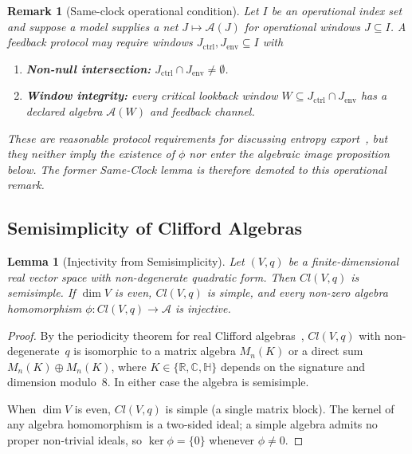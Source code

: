\documentclass[12pt,a4paper,openany]{book}
\newtheorem{lemma}[theorem]{Lemma}
\newtheorem{remark}[theorem]{Remark}
\begin{document}
\begin{remark}[Same-clock operational condition]
Let $I$ be an operational index set and suppose a model supplies a net $J\mapsto\mathcal A(J)$ for operational windows $J\subseteq I$.  A feedback protocol may require windows $J_{\mathrm{ctrl}},J_{\mathrm{env}}\subseteq I$ with
\begin{enumerate}
    \item \textbf{Non-null intersection:} $J_{\mathrm{ctrl}}\cap J_{\mathrm{env}}\neq\emptyset$.
    \item \textbf{Window integrity:} every critical lookback window $W\subseteq J_{\mathrm{ctrl}}\cap J_{\mathrm{env}}$ has a declared algebra $\mathcal A(W)$ and feedback channel.
\end{enumerate}
These are reasonable protocol requirements for discussing entropy export~\cite{Seifert2012}, but they neither imply the existence of $\phi$ nor enter the algebraic image proposition below.  The former Same-Clock lemma is therefore demoted to this operational remark.
\end{remark}

\subsection{Semisimplicity of Clifford Algebras}

\begin{lemma}[Injectivity from Semisimplicity]
\label{C-lem:semisimple}
Let $(V,q)$ be a finite-dimensional real vector space with
non-degenerate quadratic form.
Then $Cl(V,q)$ is semisimple.
If\/ $\dim V$ is even, $Cl(V,q)$ is simple, and every
non-zero algebra homomorphism
$\phi: Cl(V,q) \to \mathcal{A}$ is injective.
\end{lemma}

\begin{proof}
By the periodicity theorem for real Clifford
algebras~\cite{ABS1964,LawsonMichelsohn1989}, $Cl(V,q)$
with non-degenerate~$q$ is isomorphic to a matrix algebra
$M_n(K)$ or a direct sum $M_n(K) \oplus M_n(K)$,
where $K \in \{\mathbb{R}, \mathbb{C}, \mathbb{H}\}$
depends on the signature and dimension modulo~$8$.
In either case the algebra is semisimple.

When $\dim V$ is even, $Cl(V,q)$ is simple (a single matrix
block).
The kernel of any algebra homomorphism is a two-sided ideal;
a simple algebra admits no proper non-trivial ideals,
so $\ker\phi = \{0\}$ whenever $\phi \neq 0$.
\end{proof}
\end{document}
